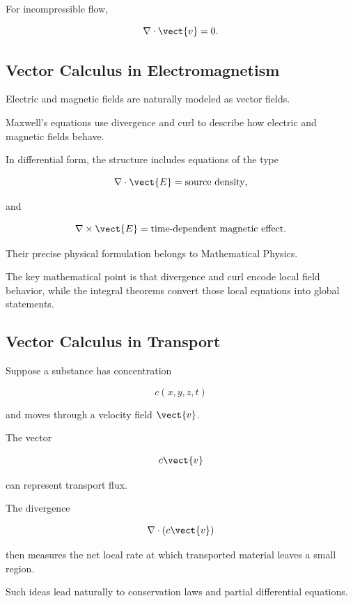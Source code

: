 For incompressible flow,

\[ \nabla\cdot\vect{v}=0. \]

\subsection{Vector Calculus in Electromagnetism}
\label{subsec:vector-calculus-electromagnetism}

Electric and magnetic fields are naturally modeled as vector fields.

Maxwell's equations use divergence and curl to describe how electric and
magnetic fields behave.

In differential form, the structure includes equations of the type

\[ \nabla\cdot\vect{E}=\text{source density}, \]

and

\[ \nabla\times\vect{E}
=\text{time-dependent magnetic effect}. \]

Their precise physical formulation belongs to Mathematical Physics.

The key mathematical point is that divergence and curl encode local field
behavior, while the integral theorems convert those local equations into
global statements.

\subsection{Vector Calculus in Transport}
\label{subsec:vector-calculus-transport}

Suppose a substance has concentration

\[ c(x,y,z,t) \]

and moves through a velocity field \(\vect{v}\).

The vector

\[ c\vect{v} \]

can represent transport flux.

The divergence

\[ \nabla\cdot(c\vect{v}) \]

then measures the net local rate at which transported material leaves a
small region.

Such ideas lead naturally to conservation laws and partial differential
equations.

